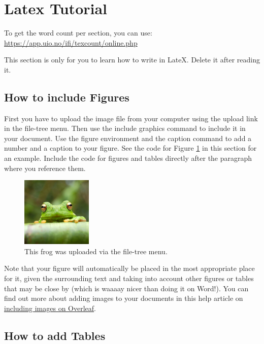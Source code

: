 \documentclass{article}
\begin{document}
\section{Latex Tutorial}
\label{sec:tutorial}

To get the word count per section, you can use: \url{https://app.uio.no/ifi/texcount/online.php}

This section is only for you to learn how to write in LateX. Delete it after reading it.


\subsection{How to include Figures}

First you have to upload the image file from your computer using the upload link in the file-tree menu.
Then use the include graphics command to include it in your document.
Use the figure environment and the caption command to add a number and a caption to your figure.
See the code for Figure \ref{fig:frog} in this section for an example. Include the code for figures
and tables directly after the paragraph where you reference them.

\begin{figure}[tb]
\centering
\includegraphics[width=0.3\textwidth]{frog.jpg}
\caption{\label{fig:frog}This frog was uploaded via the file-tree menu.}
\end{figure}

Note that your figure will automatically be placed in the most appropriate place for it,
given the surrounding text and taking into account other figures or tables that may be close by
(which is waaaay nicer than doing it on Word!).
You can find out more about adding images to your documents in this help article on
\href{https://www.overleaf.com/learn/how-to/Including_images_on_Overleaf}{including images on Overleaf}.



\subsection{How to add Tables}
\end{document}
